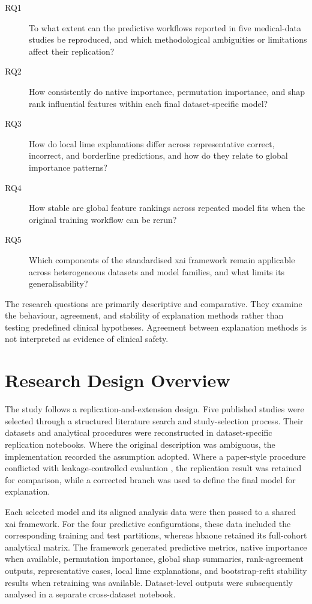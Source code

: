 \begin{description}
    \item[RQ1] To what extent can the predictive workflows reported in five medical-data studies be reproduced, and which methodological ambiguities or limitations affect their replication?

    \item[RQ2] How consistently do native importance, permutation importance, and \gls{shap} rank influential features within each final dataset-specific model?

    \item[RQ3] How do local \gls{lime} explanations differ across representative correct, incorrect, and borderline predictions, and how do they relate to global importance patterns?

    \item[RQ4] How stable are global feature rankings across repeated model fits when the original training workflow can be rerun?

    \item[RQ5] Which components of the standardised \gls{xai} framework remain applicable across heterogeneous datasets and model families, and what limits its generalisability?
\end{description}

The research questions are primarily descriptive and comparative. They examine the behaviour, agreement, and stability of explanation methods rather than testing predefined clinical hypotheses. Agreement between explanation methods is not interpreted as evidence of clinical
safety.

\section{Research Design Overview}

The study follows a replication-and-extension design. Five published studies were selected through a structured literature search and study-selection process. Their datasets and analytical procedures were reconstructed in dataset-specific replication notebooks. Where the original description was ambiguous, the implementation recorded the assumption adopted. Where a paper-style procedure conflicted with leakage-controlled
evaluation \citep{moons_probastai_2025}, the replication result was retained for comparison, while a corrected branch was used to define the final model for explanation.

Each selected model and its aligned analysis data were then passed to a shared \gls{xai} framework. For the four predictive configurations, these data included the corresponding training and test partitions, whereas \gls{hbaone} retained its full-cohort analytical matrix. The framework
generated predictive metrics, native importance when available, permutation importance, global \gls{shap} summaries, rank-agreement outputs, representative cases, local \gls{lime} explanations, and bootstrap-refit stability results when retraining was available. Dataset-level outputs were subsequently analysed in a separate cross-dataset notebook.

